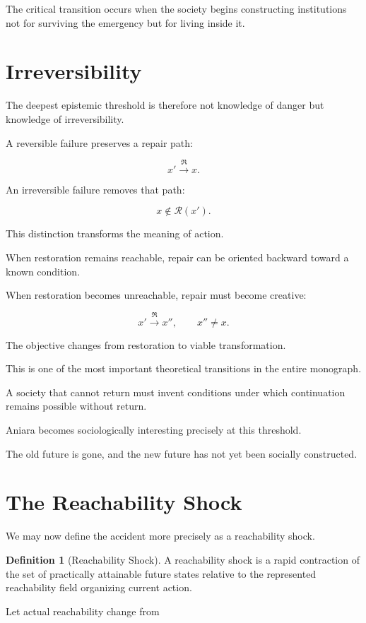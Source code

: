 \documentclass[11pt,oneside]{book}
\theoremstyle{definition}
\newtheorem{definition}[theorem]{Definition}
\theoremstyle{remark}
\newcommand{\R}{\mathcal{R}}
\newcommand{\Repair}{\mathfrak{R}}
\begin{document}
The critical transition occurs when the society begins constructing institutions not for surviving the emergency but for living inside it.

\section{Irreversibility}

The deepest epistemic threshold is therefore not knowledge of danger but knowledge of irreversibility.

A reversible failure preserves a repair path:

\[
x'
\xrightarrow{\Repair}
x.
\]

An irreversible failure removes that path:

\[
x\notin\R(x').
\]

This distinction transforms the meaning of action.

When restoration remains reachable, repair can be oriented backward toward a known condition.

When restoration becomes unreachable, repair must become creative:

\[
x'
\xrightarrow{\Repair}
x'',
\qquad
x''\neq x.
\]

The objective changes from restoration to viable transformation.

This is one of the most important theoretical transitions in the entire monograph.

A society that cannot return must invent conditions under which continuation remains possible without return.

Aniara becomes sociologically interesting precisely at this threshold.

The old future is gone, and the new future has not yet been socially constructed.

\section{The Reachability Shock}

We may now define the accident more precisely as a reachability shock.

\begin{definition}[Reachability Shock]
A reachability shock is a rapid contraction of the set of practically attainable future states relative to the represented reachability field organizing current action.
\end{definition}

Let actual reachability change from
\end{document}
